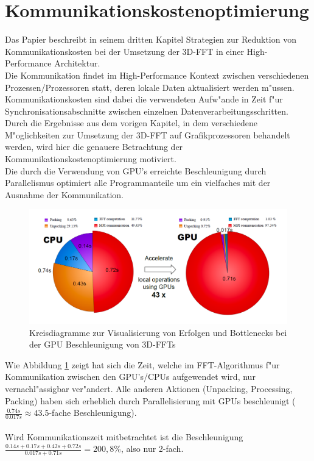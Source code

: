 \section{Kommunikationskostenoptimierung}
Das Papier \cite[Kap.3]{mainpaper} beschreibt in seinem dritten Kapitel Strategien zur Reduktion von Kommunikationskosten bei der Umsetzung der 3D-FFT in einer High-Performance Architektur.\\

Die Kommunikation findet im High-Performance Kontext zwischen verschiedenen Prozessen/Prozessoren statt, deren lokale Daten aktualisiert werden m"ussen.\\
Kommunikationskosten sind dabei die verwendeten Aufw"ande in Zeit f"ur Synchronisationsabschnitte zwischen einzelnen Datenverarbeitungsschritten.\\

Durch die Ergebnisse aus dem vorigen Kapitel, in dem verschiedene M"oglichkeiten zur Umsetzung der 3D-FFT auf Grafikprozessoren behandelt werden, wird hier die genauere Betrachtung der Kommunikationskostenoptimierung motiviert.\\

Die durch die Verwendung von GPU's erreichte Beschleunigung durch Parallelismus optimiert alle Programmanteile um ein vielfaches mit der Ausnahme der Kommunikation.\\

\begin{figure}
\centering
  \includegraphics[width=\linewidth]{res/speedup.png}
  \caption{\cite[Abb. 3]{mainpaper} Kreisdiagramme zur Visualisierung von Erfolgen und Bottlenecks bei der GPU Beschleunigung von 3D-FFTs}
  \label{fig:speedup}
\end{figure}

Wie Abbildung \ref{fig:speedup} zeigt hat sich die Zeit, welche im FFT-Algorithmus f"ur Kommunikation zwischen den GPU's/CPUs aufgewendet wird, nur vernachl"assigbar ver"andert. Alle anderen Aktionen (Unpacking, Processing, Packing) haben sich erheblich durch Parallelisierung mit GPUs beschleunigt ($ \frac{0.74s}{0.017s} \approx 43.5$-fache Beschleunigung).\\
\\
Wird Kommunikationszeit mitbetrachtet ist die Beschleunigung $\frac{0.14s+0.17s+0.42s+0.72s}{0.017s+0.71s}=200,8\%$, also nur 2-fach.


